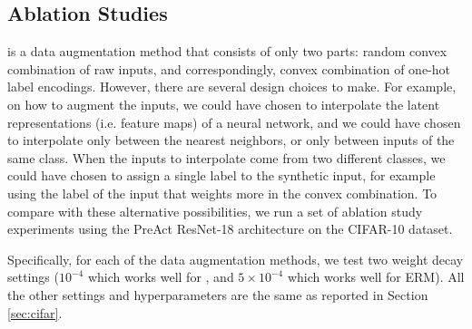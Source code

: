 \subsection{Ablation Studies}
\label{sec:ablation}
\mixup{} is a data augmentation method that consists of only two parts: random convex combination of raw inputs, and correspondingly, convex combination of one-hot label encodings. However, there are several design choices to make. For example, on how to augment the inputs, we could have chosen to interpolate the latent representations (i.e. feature maps) of a neural network, and we could have chosen to interpolate only between the nearest neighbors, or only between inputs of the same class. When the inputs to interpolate come from two different classes, we could have chosen to assign a single label to the synthetic input, for example using the label of the input that weights more in the convex combination. To compare \mixup{} with these alternative possibilities, we run a set of ablation study experiments using the PreAct ResNet-18 architecture on the CIFAR-10 dataset.

Specifically, for each of the data augmentation methods, we test two weight decay settings ($10^{-4}$ which works well for \mixup{}, and $5\times 10^{-4}$ which works well for ERM). All the other settings and hyperparameters are the same as reported in Section \ref{sec:cifar}.

